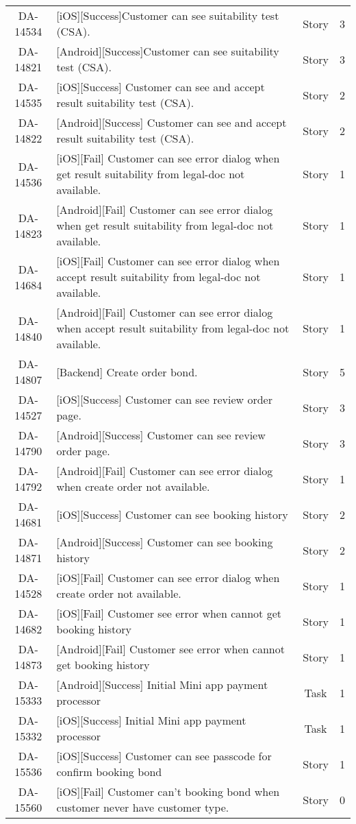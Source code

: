 \begin{tabularx}{\linewidth}{|c|X|c|c|}
    DA-14534 &[iOS][Success]Customer can see suitability test (CSA). &Story &3\\
    DA-14821 &[Android][Success]Customer can see suitability test (CSA). &Story &3\\
    DA-14535 &[iOS][Success] Customer can see and accept result suitability test (CSA). &Story &2\\
    DA-14822 &[Android][Success] Customer can see and accept result suitability test (CSA). &Story &2\\
    DA-14536 &[iOS][Fail] Customer can see error dialog when get result suitability from legal-doc not available. &Story &1\\
    DA-14823 &[Android][Fail] Customer can see error dialog when get result suitability from legal-doc not available. &Story &1\\
    DA-14684 &[iOS][Fail] Customer can see error dialog when accept result suitability from legal-doc not available. &Story &1\\
    DA-14840 &[Android][Fail] Customer can see error dialog when accept result suitability from legal-doc not available. &Story &1\\
    DA-14807 &[Backend] Create order bond. &Story &5\\
    DA-14527 &[iOS][Success] Customer can see review order page. &Story &3\\
    DA-14790 &[Android][Success] Customer can see review order page. &Story &3\\
    DA-14792 &[Android][Fail] Customer can see error dialog when create order not available. &Story &1\\
    DA-14681 &[iOS][Success] Customer can see booking history &Story &2\\
    DA-14871 &[Android][Success] Customer can see booking history &Story &2\\
    DA-14528 &[iOS][Fail] Customer can see error dialog when create order not available. &Story &1\\
    DA-14682 &[iOS][Fail] Customer see error when cannot get booking history &Story &1\\
    DA-14873 &[Android][Fail] Customer see error when cannot get booking history &Story &1\\
    DA-15333 &[Android][Success] Initial Mini app payment processor &Task &1\\
    DA-15332 &[iOS][Success] Initial Mini app payment processor &Task &1\\
    DA-15536 &[iOS][Success] Customer can see passcode for confirm booking bond &Story &1\\
    DA-15560 &[iOS][Fail] Customer can't booking bond when customer never have customer type. &Story &0\\
	\hline
\end{tabularx}


